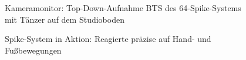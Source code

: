 \begin{figure}[htbp]
    \centering
    \caption{Kameramonitor: Top-Down-Aufnahme BTS des 64-Spike-Systems mit Tänzer auf dem Studioboden}
    \label{fig:camera_monitor}
\end{figure}

\begin{figure}[htbp]
    \centering
    \caption{Spike-System in Aktion: Reagierte präzise auf Hand- und Fußbewegungen}
    \label{fig:spike_action}
\end{figure}

